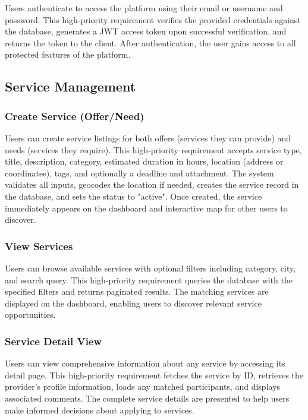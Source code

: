 \documentclass[12pt,a4paper]{report}
\begin{document}
Users authenticate to access the platform using their email or username and password. This high-priority requirement verifies the provided credentials against the database, generates a JWT access token upon successful verification, and returns the token to the client. After authentication, the user gains access to all protected features of the platform.

\subsection{Service Management}

\subsubsection{Create Service (Offer/Need)}

Users can create service listings for both offers (services they can provide) and needs (services they require). This high-priority requirement accepts service type, title, description, category, estimated duration in hours, location (address or coordinates), tags, and optionally a deadline and attachment. The system validates all inputs, geocodes the location if needed, creates the service record in the database, and sets the status to "active". Once created, the service immediately appears on the dashboard and interactive map for other users to discover.

\subsubsection{View Services}

Users can browse available services with optional filters including category, city, and search query. This high-priority requirement queries the database with the specified filters and returns paginated results. The matching services are displayed on the dashboard, enabling users to discover relevant service opportunities.

\subsubsection{Service Detail View}

Users can view comprehensive information about any service by accessing its detail page. This high-priority requirement fetches the service by ID, retrieves the provider's profile information, loads any matched participants, and displays associated comments. The complete service details are presented to help users make informed decisions about applying to services.
\end{document}
